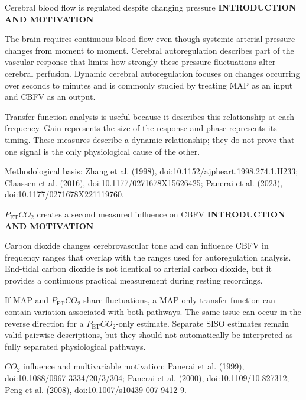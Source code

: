 \documentclass[aspectratio=169,11pt]{beamer}
\newcommand{\PETCOtwo}{P_{\mathrm{ET}}CO_2}
\newcommand{\sectionlabel}[1]{%
  {\color{Accent}\fontsize{8}{9.5}\selectfont\bfseries\MakeUppercase{#1}}\par\vspace{0.12cm}}
\newcommand{\sourcefooter}[1]{%
  \par\vfill{\color{Muted}\fontsize{6.8}{8}\selectfont #1}}
\begin{document}
\begin{frame}{Cerebral blood flow is regulated despite changing pressure}
\sectionlabel{Introduction and Motivation}
The brain requires continuous blood flow even though systemic arterial pressure
changes from moment to moment. Cerebral autoregulation describes part of the
vascular response that limits how strongly these pressure fluctuations alter
cerebral perfusion. Dynamic cerebral autoregulation focuses on changes occurring
over seconds to minutes and is commonly studied by treating MAP as an input and
CBFV as an output.

\vspace{0.4cm}
Transfer function analysis is useful because it describes this relationship at
each frequency. Gain represents the size of the response and phase represents its
timing. These measures describe a dynamic relationship; they do not prove that
one signal is the only physiological cause of the other.
\sourcefooter{Methodological basis: Zhang et al. (1998), doi:10.1152/ajpheart.1998.274.1.H233; Claassen et al. (2016), doi:10.1177/0271678X15626425; Panerai et al. (2023), doi:10.1177/0271678X221119760.}
\end{frame}

\begin{frame}{$\PETCOtwo$ creates a second measured influence on CBFV}
\sectionlabel{Introduction and Motivation}
Carbon dioxide changes cerebrovascular tone and can influence CBFV in frequency
ranges that overlap with the ranges used for autoregulation analysis. End-tidal
carbon dioxide is not identical to arterial carbon dioxide, but it provides a
continuous practical measurement during resting recordings.

\vspace{0.4cm}
If MAP and $\PETCOtwo$ share fluctuations, a MAP-only transfer function can
contain variation associated with both pathways. The same issue can occur in the
reverse direction for a $\PETCOtwo$-only estimate. Separate SISO estimates remain
valid pairwise descriptions, but they should not automatically be interpreted as
fully separated physiological pathways.
\sourcefooter{$CO_2$ influence and multivariable motivation: Panerai et al. (1999), doi:10.1088/0967-3334/20/3/304; Panerai et al. (2000), doi:10.1109/10.827312; Peng et al. (2008), doi:10.1007/s10439-007-9412-9.}
\end{frame}
\end{document}
